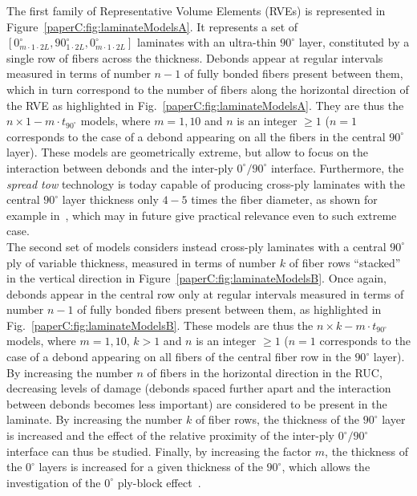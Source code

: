 The first family of Representative Volume Elements (RVEs) is represented in Figure~\ref{paperC:fig:laminateModelsA}. It represents a set of $\left[0_{m\cdot 1\cdot2L}^{\circ},90_{1\cdot2L}^{\circ},0_{m\cdot 1\cdot2L}^{\circ}\right]$ laminates with an ultra-thin $90^{\circ}$ layer, constituted by a single row of fibers across the thickness. Debonds appear at regular intervals measured in terms of number $n-1$ of fully bonded fibers present between them, which in turn correspond to the number of fibers along the horizontal direction of the RVE as highlighted in Fig.~\ref{paperC:fig:laminateModelsA}. They are thus the $n\times1-m\cdot t_{90^{\circ}}$ models, where $m=1,10$ and $n$ is an integer $\geq1$ ($n=1$ corresponds to the case of a debond appearing on all the fibers in the central $90^{\circ}$ layer). These models are geometrically extreme, but allow to focus on the interaction between debonds and the inter-ply $0^{\circ}/90^{\circ}$ interface. Furthermore, the \emph{spread tow} technology is today capable of producing cross-ply laminates with the central $90^{\circ}$ layer thickness only $4-5$ times the fiber diameter, as shown for example in~\cite{Saito2012}, which may in future give practical relevance even to such extreme case.\\
The second set of models considers instead cross-ply laminates with a central $90^{\circ}$ ply of variable thickness, measured in terms of number $k$ of fiber rows ``stacked'' in the vertical direction in Figure~\ref{paperC:fig:laminateModelsB}. Once again, debonds appear in the central row only at regular intervals measured in terms of number $n-1$ of fully bonded fibers present between them, as highlighted in Fig.~\ref{paperC:fig:laminateModelsB}. These models are thus the $n\times k-m\cdot t_{90^{\circ}}$ models, where $m=1,10$, $k>1$ and $n$ is an integer $\geq1$ ($n=1$ corresponds to the case of a debond appearing on all fibers of the central fiber row in the $90^{\circ}$ layer). By increasing the number $n$ of fibers in the horizontal direction in the RUC, decreasing levels of damage (debonds spaced further apart and the interaction between debonds becomes less important) are considered to be present in the laminate. By increasing the number $k$ of fiber rows, the thickness of the $90^{\circ}$ layer is increased and the effect of the relative proximity of the inter-ply $0^{\circ}/90^{\circ}$ interface can thus be studied. Finally, by increasing the factor $m$, the thickness of the $0^{\circ}$ layers is increased for a given thickness of the $90^{\circ}$, which allows the investigation of the $0^{\circ}$ ply-block effect~\cite{Teixeira2016}.

